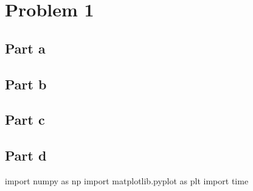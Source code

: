 \documentclass[a4paper, 12pt]{article}
\begin{document}
\begin{sloppypar}


\section{Problem 1}


\subsection{Part a}
\subsection{Part b}
\subsection{Part c}
\subsection{Part d}

% 
% 


% 
% 
% 
% 

\begin{python}
import numpy as np
import matplotlib.pyplot as plt
import time


\end{python}
\end{sloppypar}
\end{document}

